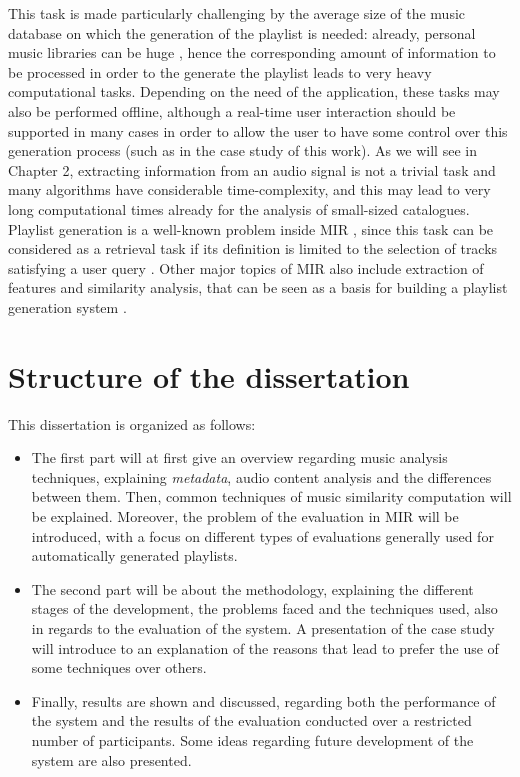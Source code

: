 This task is made particularly challenging by the average size of the music database on which the generation of the playlist is needed: already, personal music libraries can be huge \cite{dias10}, hence the corresponding amount of information to be processed in order to the generate the playlist leads to very heavy computational tasks. Depending on the need of the application, these tasks may also be performed offline, although a real-time user interaction should be supported in many cases in order to allow the user to have some control over this generation process (such as in the case study of this work). As we will see in Chapter 2, extracting information from an audio signal is not a trivial task and many algorithms have considerable time-complexity, and this may lead to very long computational times already for the analysis of small-sized catalogues. Playlist generation is a well-known problem inside MIR \cite{downey03} \cite{grachten09}, since this task can be considered as a retrieval task if its definition is limited to the selection of tracks satisfying a user query \cite{bonnin14}. Other major topics of MIR also include extraction of features and similarity analysis, that can be seen as a basis for building a playlist generation system \cite{dopler08}. 

\section{Structure of the dissertation}
This dissertation is organized as follows:
\begin{itemize}
\item The first part will at first give an overview regarding music analysis techniques, explaining \textit{metadata}, audio content analysis and the differences between them. Then, common techniques of music similarity computation will be explained. Moreover, the problem of the evaluation in MIR will be introduced, with a focus on different types of evaluations generally used for automatically generated playlists. 
\item The second part will be about the methodology, explaining the different stages of the development, the problems faced and the techniques used, also in regards to the evaluation of the system. A presentation of the case study will introduce to an explanation of the reasons that lead to prefer the use of some techniques over others. 
\item Finally, results are shown and discussed, regarding both the performance of the system and the results of the evaluation conducted over a restricted number of participants. Some ideas regarding future development of the system are also presented.
\end{itemize}

